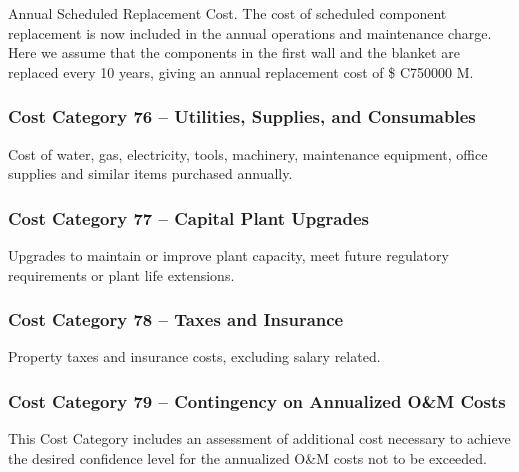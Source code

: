 Annual Scheduled Replacement Cost. The cost of scheduled component replacement is now included in the annual operations and maintenance charge.  Here we assume that the components in the first wall and the blanket are replaced every 10 years, giving an annual replacement cost of \$ C750000 M.


\subsubsection*{Cost Category 76 – Utilities, Supplies, and Consumables}
Cost of water, gas, electricity, tools, machinery, maintenance equipment, office supplies and similar items purchased annually.

\subsubsection*{Cost Category 77 – Capital Plant Upgrades}
Upgrades to maintain or improve plant capacity, meet future regulatory requirements or plant life extensions.

\subsubsection*{Cost Category 78 – Taxes and Insurance}
Property taxes and insurance costs, excluding salary related.

\subsubsection*{Cost Category 79 – Contingency on Annualized O\&M Costs}
This Cost Category includes an assessment of additional cost necessary to achieve the desired confidence level for the annualized O\&M costs not to be exceeded.
